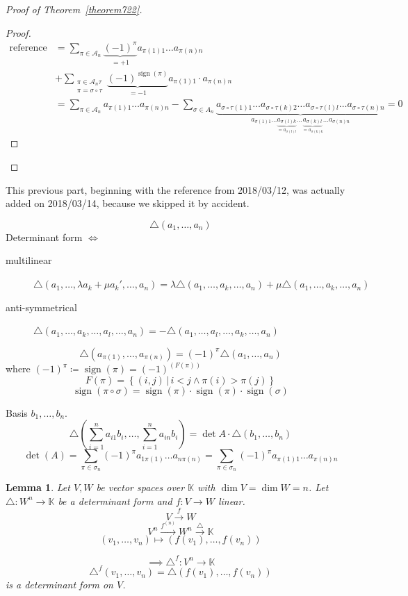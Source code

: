 \documentclass{article}
\newtheorem{lemma}{Lemma}  \numberwithin{lemma}{section}
\newcommand{\setdef}[2]{\left\{\left.#1\,\right|\,#2\right\}}
\DeclareMathOperator{\sign}{sign}
\begin{document}
\begin{proof}[Proof of Theorem~\ref{theorem722}]
\begin{enumerate}
\begin{proof}
        \begin{align*}
          \text{reference *} &= \sum_{\pi \in \mathcal A_n} \underbrace{(-1)^\pi}_{=+1} a_{\pi(1) 1} \dots a_{\pi(n) n} \\
            &+ \sum_{\substack{\pi \in \mathcal A_n \tau \\ \pi = \sigma \circ \tau}} \underbrace{(-1)^{\sign(\pi)}}_{= -1} a_{\pi(1) 1} \cdot a_{\pi(n) n} \\
            &= \sum_{\pi \in \mathcal A_n} a_{\pi(1) 1} \dots a_{\pi(n) n} - \sum_{\sigma \in A_n} \underbrace{a_{\sigma \circ \tau(1) 1} \dots a_{\sigma \circ \tau(k) 2} \dots a_{\sigma \circ \tau(l) l} \dots a_{\sigma \circ \tau(n) n}}_{a_{\sigma(1) 1} \dots \underbrace{a_{\sigma(l) k}}_{=a_{\sigma(l) l}} \dots \underbrace{a_{\sigma(k) l}}_{= a_{\sigma(k) k}} \dots a_{\sigma(n) n}} = 0
        \end{align*}
      \end{proof}
  \end{enumerate}
\end{proof}

This previous part, beginning with the reference from 2018/03/12, was actually added on 2018/03/14, because we skipped it by accident.

\[ \triangle(a_1, \dots, a_n) \]
Determinant form $\iff$
\begin{description}
  \item[multilinear] $\triangle(a_1, \dots, \lambda a_k + \mu a_k', \dots, a_n) = \lambda \triangle(a_1, \dots, a_k, \dots, a_n) + \mu \triangle(a_1, \dots, a_k, \dots, a_n)$
  \item[anti-symmetrical] $\triangle(a_1, \dots, a_k, \dots, a_l, \dots, a_n) = -\triangle(a_1, \dots, a_l, \dots, a_k, \dots, a_n)$
\end{description}

\[ \triangle (a_{\pi(1)}, \dots, a_{\pi(n)}) = (-1)^\pi \triangle(a_1,\dots,a_n) \]
where $(-1)^\pi \coloneqq \sign(\pi) = (-1)^{(F(\pi))}$
\[ F(\pi) = \setdef{(i,j)}{i < j \land \pi(i) > \pi(j)} \]
\[ \sign(\pi \circ \sigma) = \sign(\pi) \cdot \sign(\pi) \cdot \sign(\sigma) \]

Basis $b_1,\dots,b_n$.
\[ \triangle(\sum_{i=1}^n a_{i1} b_i, \dots, \sum_{i=1}^n a_{in} b_i) = \det{A} \cdot \triangle(b_1, \dots, b_n) \]
\[ \det(A) = \sum_{\pi \in \sigma_n} (-1)^\pi  a_{1\pi(1)} \dots a_{n\pi(n)} = \sum_{\pi \in \sigma_n} (-1)^\pi a_{\pi(1) 1} \dots a_{\pi(n) n} \]

\begin{lemma} %
  Let $V, W$ be vector spaces over $\mathbb K$ with $\dim{V} = \dim{W} = n$.
  Let $\triangle: W^n \to \mathbb K$ be a determinant form and $f: V \to W$ linear.
  \[ V \xrightarrow{f} W \]
  \[ V^n \xrightarrow{f^{(n)}} W^n \xrightarrow{\triangle} \mathbb K \]
  \[ (v_1, \dots, v_n) \mapsto (f(v_1), \dots, f(v_n)) \]

  \[ \implies \triangle^f: V^n \to \mathbb K \]
  \[ \triangle^f(v_1, \dots, v_n) = \triangle(f(v_1), \dots, f(v_n)) \]
  is a determinant form on $V$.
\end{lemma}
\end{document}
